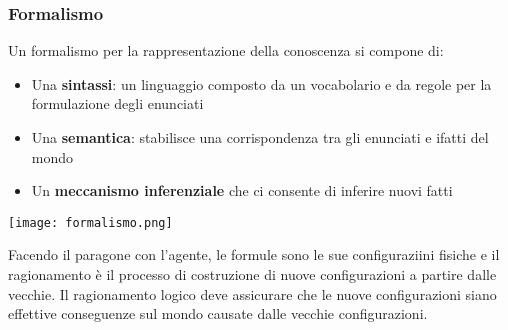 \subsubsection{Formalismo}
Un formalismo per la rappresentazione della conoscenza si compone di:
\begin{itemize}
	\item Una \textbf{sintassi}: un linguaggio composto da un vocabolario e da regole per la formulazione degli enunciati
	\item Una \textbf{semantica}: stabilisce una corrispondenza tra gli enunciati e ifatti del mondo
	\item Un \textbf{meccanismo inferenziale} che ci consente di inferire nuovi fatti
\end{itemize}
\begin{center}
	\texttt{[image: formalismo.png]}
\end{center}
Facendo il paragone con l'agente, le formule sono le sue configuraziini fisiche e il ragionamento è il processo di costruzione di nuove configurazioni a partire dalle vecchie. Il ragionamento logico deve assicurare che le nuove configurazioni siano effettive conseguenze sul mondo causate dalle vecchie configurazioni.